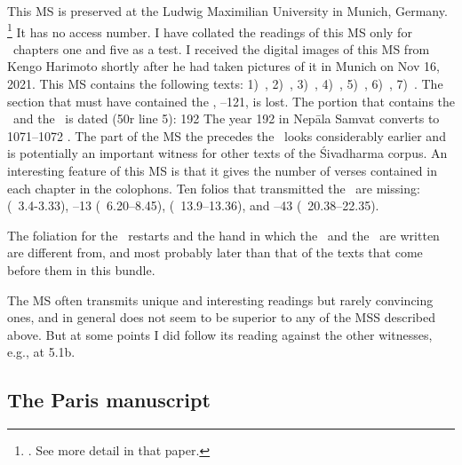 This MS is preserved at the Ludwig Maximilian University
in Munich, Germany.%
			\footnote{. 
			See more detail in that paper.}
It has no access number.
I have collated the readings of this MS only for \VSS\ 
chapters one and five as a test.
I received the digital images of this MS from Kengo Harimoto
shortly after he had taken pictures of it in Munich on  Nov 16, 2021. 
This MS contains the following texts:
1)~\SDhS, 
2)~\SDhU, 
3)~\Ums,
4)~\SivaUp,
5)~\Vss, 
6)~\Uums,
7)~\DharmP.
The section that must have contained the \SDhSangr, --121, is lost. 
The portion that contains the \VSS\ and the \DharmP\
is dated (\fol50r line 5):  192  The year 192 in Nepāla Samvat converts to 
1071--1072 \CE. The part of the MS the precedes the \VSS\ looks
considerably earlier and is potentially an important witness for
other texts of the Śivadharma corpus. An interesting 
feature of this MS is that it gives the number of verses contained in
each chapter in the colophons. Ten folios that transmitted the \VSS\
are missing: 
\fol5 (\VSS\ 3.4-3.33),
\fols11--13 (\VSS\ 6.20--8.45),
\fols24 (\VSS\ 13.9--13.36), and
\fols39--43 (\VSS\ 20.38--22.35). 

The foliation for the \VSS\ restarts
and the hand in which the \VSS\ and the \DharmP\ are written are different from, and
most probably later than that of the texts that come 
before them in this bundle. 

The MS often transmits unique and interesting readings
but rarely convincing ones, and in general does not seem to be superior 
to any of the MSS described above. But at some points
I did follow its reading against the other witnesses, e.g., at 5.1b.


\medskip
\subsection{The Paris manuscript}

